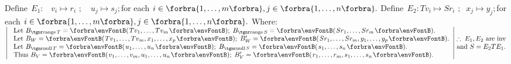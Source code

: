 

$\text{Define}\;\,E_1:\,\,\,\,\, v_i\mapsto r_i\,\,;\quad u_j\mapsto s_j;$\quad for each $i\in\Bra{1,\dots,m},j\in\Bra{1,\dots,n}.$\parSol{}
$\text{Define}\;\,E_2:Tv_i\mapsto Sr_i\,\,;\;\;x_j\mapsto y_j;$\quad for each $i\in\Bra{1,\dots,m},j\in\Bra{1,\dots,n}.$
Where:\parSol{\vspace{6pt}}
$\MathLeftrightMid{l}{$
	Let $B_{\range T}=\Par{Tv_1,\dots,Tv_m};\;B_{\range S}=\Par{Sr_1,\dots,Sr_m}.\\ $
	Let $B_W=\Par{Tv_1,\dots,Tv_m,x_1,\dots,x_p};\;B_W'=\Par{Sr_1,\dots,Sr_m,y_1,\dots,y_p}.\\ $
	Let $B_{\null T}=\Par{u_1,\dots,u_n};\;B_{\null S}=\Par{s_1,\dots,s_n}.\\ $
	Thus $B_V=\Par{v_1,\dots,v_m,u_1,\dots,u_n};\;B_V'=\Par{r_1,\dots,r_m,s_1,\dots,s_n}.}\hMath{c}{}{}{\therefore\;E_1,E_2$ are inv$ \\ $and $S=E_2 TE_1.}$\PfEnd
\SepLine[0pt][\Blind{\BulletPointX} ]

